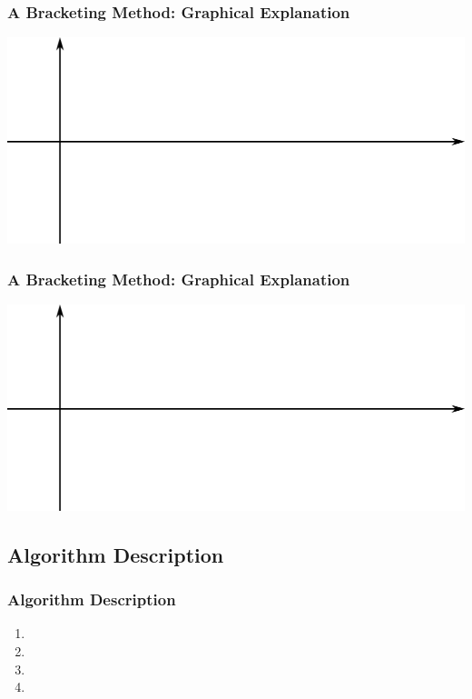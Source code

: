 \documentclass[fleqn]{beamer} %
\newcommand{\sectionIIIsubsectionIItitle}{A Bracketing Method: Graphical Explanation}
\newcommand{\sectionIIIsubsectionIIItitle}{Algorithm Description}
\begin{document}
			\begin{frame}
				\frametitle{\sectionIIIsubsectionIItitle}
				\bigskip
				
				\includegraphics[scale=.40]{images/topic3_fig1.png}

				\btVFill
			\end{frame}

			\begin{frame}
				\frametitle{\sectionIIIsubsectionIItitle}
				\bigskip
					
				\includegraphics[scale=.40]{images/topic3_fig1.png}
				
				\btVFill
			\end{frame}

		\subsection{\sectionIIIsubsectionIIItitle}\label{sectionIIIsubsectionIII}

			\begin{frame}
				\frametitle{\sectionIIIsubsectionIIItitle}
				\bigskip

				\begin{enumerate}
					\item \vspace{5mm}
					\item \vspace{5mm}
					\item \vspace{5mm}
					\item \vspace{5mm}
				\end{enumerate}
				
				\btVFill
			\end{frame}
\end{document}
